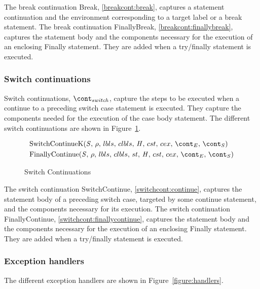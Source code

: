 \documentclass[a4paper,oneside]{article}
\begin{document}
The break continuation Break, \ref{breakcont:break}, captures a statement continuation and the environment corresponding to a target label or a break statement.
The break continuation FinallyBreak, \ref{breakcont:finallybreak}, captures the statement body and the components necessary for the execution of an enclosing Finally statement.
They are added when a try/finally statement is executed.


\subsubsection{Switch continuations}
\label{subsubsec:switch-continuations}

Switch continuations, $\switchcont$, capture the steps to be executed when a continue to a preceding switch case statement is executed.
They capture the components needed for the execution of the case body statement.
The different switch continuations are shown in Figure~\ref{figure:switchconts}.
%
\newcommand{\ContinueK}{\mathrm{SwitchContinueK}(\stmt,\,\env,\,\lbls,\,\clbls,\,\handler,\,\cstrace,\,\cex,\,\econt,\,\scont)}
\newcommand{\FinallyContinue}[2]{\mathrm{FinallyContinue}({#1},\,\env,\,\lbls,\,\clbls,\,\strace,\,\handler,\,\cstrace,\,\cex,\,\econt,\,{#2})}

\begin{figure}[Htp]
  \begin{align}
    &\ContinueK \label{switchcont:continue} \\
    &\FinallyContinue{\stmt}{\scont} \label{switchcont:finallycontinue}
  \end{align}
  \caption{Switch Continuations}
  \label{figure:switchconts}
\end{figure}

The switch continuation SwitchContinue, \ref{switchcont:continue}, captures the statement body of a preceding switch case, targeted by some continue statement, and the components necessary for its execution.
The switch continuation FinallyContinue, \ref{switchcont:finallycontinue}, captures the statement body and the components necessary for the execution of an enclosing Finally statement.
They are added when a try/finally statement is executed.


\subsubsection{Exception handlers}
\label{subsubsec:exception-handlers}

The different exception handlers are shown in Figure~\ref{figure:handlers}.
\newcommand{\ThrowH}[2]{\mathrm{ThrowK}({#1},\,{#2})}
\newcommand{\CatchH}[1]{\mathrm{Catch}({#1},\,\env,\,\lbls,\,\clbls,\,\strace,\,\handler,\,\econt,\,\scont)}
\end{document}
